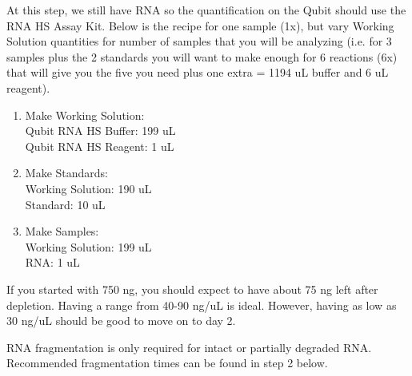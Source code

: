\documentclass[11pt, oneside]{article}
\begin{document}
		\begin{adjustwidth}{0.25in}{0pt} At this step, we still have RNA so the quantification on the Qubit should use the RNA HS Assay Kit. Below is the 		recipe for one sample (1x), but vary Working Solution quantities for number of samples that you will be analyzing (i.e. for 3 samples plus the 2 			standards you will want to make enough for 6 reactions (6x) that will give you the five you need plus one extra = 1194 uL buffer and 6 uL reagent).
		
		\begin{enumerate}
			\item Make Working Solution: \\
				\hspace{0.25in} Qubit RNA HS Buffer: 199 uL \\
				\hspace{0.25in} Qubit RNA HS Reagent: 1 uL \\
			\item	Make Standards: \\
				\hspace{0.25in} Working Solution: 190 uL \\
				\hspace{0.25in} Standard: 10 uL
			\item	Make Samples: \\
				\hspace{0.25in} Working Solution: 199 uL \\
				\hspace{0.25in} RNA: 1 uL \\
		\end{enumerate}

		\noindent If you started with 750 ng, you should expect to have about 75 ng left after depletion. Having a range from 40-90 ng/uL is ideal. However, 		having as low as 30 ng/uL should be good to move on to day 2. 
		
		\end{adjustwidth}
		
		\vspace{3mm}
		
		
		\noindent {} RNA fragmentation is only required for intact or partially degraded RNA. Recommended 			fragmentation times can be found in step 2 below. 
		
\end{document}
